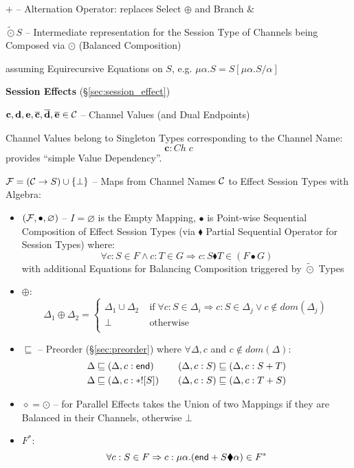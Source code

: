 $+$ -- Alternation Operator: replaces Select $\oplus$ and Branch $\&$

$\tilde{\odot}S$ -- Intermediate representation for the Session Type
of Channels being Composed via $\odot$ (Balanced Composition)

assuming Equirecursive Equations on $S$, e.g. $\mu\alpha.S =
S[\mu\alpha.S/\alpha]$


\textbf{Session Effects} (\S\ref{sec:session_effect})

$\mathbf{c,d,e,\overline{c},\overline{d},\overline{e}}
\in \mathcal{C}$ -- Channel Values (and Dual Endpoints)

Channel Values belong to Singleton Types corresponding to the Channel
Name:
\[
  \mathbf{c} : Ch\;c
\]
provides ``simple Value Dependency''. %

$\mathcal{F} = (\mathcal{C} \rightarrow S) \cup \{\bot\}$ -- Maps from
Channel Names $\mathcal{C}$ to Effect Session Types with Algebra:
\begin{itemize}
  \item $(\mathcal{F},\bullet,\varnothing)$ -- $I = \varnothing$ is the
    Empty Mapping, $\bullet$ is Point-wise Sequential Composition of
    Effect Session Types (via $\blacklozenge$ Partial Sequential
    Operator for Session Types) where:
    \[
      \forall c:S \in F \wedge c:T \in G
        \Rightarrow c:S \blacklozenge T \in (F \bullet G)
    \]
    with additional Equations for Balancing Composition triggered by
    $\tilde{\odot}$ Types %
  \item $\oplus$:
    \[
      \Delta_1 \oplus \Delta_2 =
      \begin{cases}
        \Delta_1 \cup \Delta_2 & \;\text{if}\;
          \forall c:S \in \Delta_i
          \Rightarrow c:S \in \Delta_j \vee c \notin dom(\Delta_j) \\
        \bot & \;\text{otherwise} \\
      \end{cases}
    \]
  \item $\sqsubseteq$ -- Preorder (\S\ref{sec:preorder}) where
    $\forall\Delta,c$ and $c \notin dom(\Delta)$:
    \[\begin{aligned}
        \Delta &\sqsubseteq (\Delta,c:\mathsf{end}) \\
        \Delta &\sqsubseteq (\Delta,c:*![S]) \\
      \end{aligned}
      \quad\quad
      \begin{aligned}
        (\Delta,c:S) &\sqsubseteq (\Delta,c:S + T) \\
        (\Delta,c:S) &\sqsubseteq (\Delta,c:T + S) \\
    \end{aligned}\]
  \item $\diamond = \odot$ -- for Parallel Effects takes the Union of
    two Mappings if they are Balanced in their Channels, otherwise
    $\bot$ %
  \item $F^*$:
    \[
      \forall c:S \in F
        \Rightarrow c:\mu\alpha.(\mathsf{end} + S \blacklozenge \alpha) \in F^*
    \]
\end{itemize}

